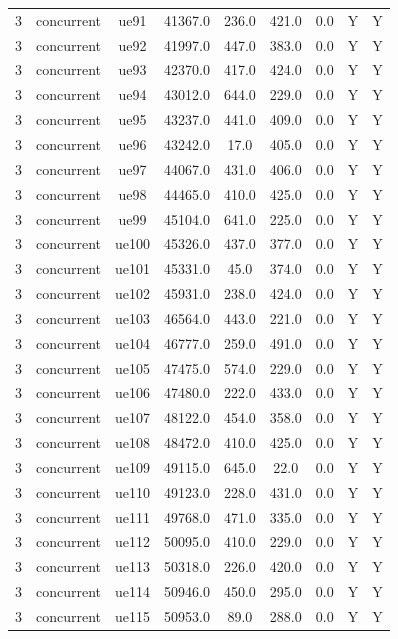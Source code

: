 \begin{table}[ht]
\begin{tabular}{|c|c|c|c|c|c|c|c|c|}
3 & concurrent & ue91 & 41367.0 & 236.0 & 421.0 & 0.0 & Y & Y \\
3 & concurrent & ue92 & 41997.0 & 447.0 & 383.0 & 0.0 & Y & Y \\
3 & concurrent & ue93 & 42370.0 & 417.0 & 424.0 & 0.0 & Y & Y \\
3 & concurrent & ue94 & 43012.0 & 644.0 & 229.0 & 0.0 & Y & Y \\
3 & concurrent & ue95 & 43237.0 & 441.0 & 409.0 & 0.0 & Y & Y \\
3 & concurrent & ue96 & 43242.0 & 17.0 & 405.0 & 0.0 & Y & Y \\
3 & concurrent & ue97 & 44067.0 & 431.0 & 406.0 & 0.0 & Y & Y \\
3 & concurrent & ue98 & 44465.0 & 410.0 & 425.0 & 0.0 & Y & Y \\
3 & concurrent & ue99 & 45104.0 & 641.0 & 225.0 & 0.0 & Y & Y \\
3 & concurrent & ue100 & 45326.0 & 437.0 & 377.0 & 0.0 & Y & Y \\
3 & concurrent & ue101 & 45331.0 & 45.0 & 374.0 & 0.0 & Y & Y \\
3 & concurrent & ue102 & 45931.0 & 238.0 & 424.0 & 0.0 & Y & Y \\
3 & concurrent & ue103 & 46564.0 & 443.0 & 221.0 & 0.0 & Y & Y \\
3 & concurrent & ue104 & 46777.0 & 259.0 & 491.0 & 0.0 & Y & Y \\
3 & concurrent & ue105 & 47475.0 & 574.0 & 229.0 & 0.0 & Y & Y \\
3 & concurrent & ue106 & 47480.0 & 222.0 & 433.0 & 0.0 & Y & Y \\
3 & concurrent & ue107 & 48122.0 & 454.0 & 358.0 & 0.0 & Y & Y \\
3 & concurrent & ue108 & 48472.0 & 410.0 & 425.0 & 0.0 & Y & Y \\
3 & concurrent & ue109 & 49115.0 & 645.0 & 22.0 & 0.0 & Y & Y \\
3 & concurrent & ue110 & 49123.0 & 228.0 & 431.0 & 0.0 & Y & Y \\
3 & concurrent & ue111 & 49768.0 & 471.0 & 335.0 & 0.0 & Y & Y \\
3 & concurrent & ue112 & 50095.0 & 410.0 & 229.0 & 0.0 & Y & Y \\
3 & concurrent & ue113 & 50318.0 & 226.0 & 420.0 & 0.0 & Y & Y \\
3 & concurrent & ue114 & 50946.0 & 450.0 & 295.0 & 0.0 & Y & Y \\
3 & concurrent & ue115 & 50953.0 & 89.0 & 288.0 & 0.0 & Y & Y \\

\end{tabular}
\end{table}
